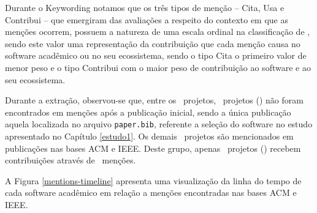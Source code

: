 Durante o Keywording notamos que os três tipos de menção -- Cita, Usa e
Contribui -- que emergiram das avaliações a respeito do contexto em que as
menções ocorrem, possuem a natureza de uma escala ordinal na classificação de
, sendo este valor
uma representação da contribuição que cada menção causa no software acadêmico
ou no seu ecossistema, sendo o tipo Cita o primeiro valor de menor peso e o
tipo Contribui com o maior peso de contribuição ao software e ao seu
ecossistema.

Durante a extração, observou-se que, 
entre os \SoftwareCount \ projetos, \SoftwareNotMentionedCount \ projetos
() não foram encontrados em menções
após a publicação inicial, sendo a única publicação aquela localizada no
arquivo \texttt{paper.bib}, referente a seleção do software no estudo
apresentado no Capítulo \ref{estudo1}.
%
Os demais \MentionsStudyDois \ projetos são mencionados em publicações nas
bases ACM e IEEE. Deste grupo, apenas \ContributeStudyDoisSoftware \ projetos
() recebem contribuições através de
\ContributeStudyDoisCount \ menções.

A Figura \ref{mentions-timeline} apresenta uma visualização da linha do tempo
de cada software acadêmico em relação a menções encontradas nas bases ACM e IEEE.

